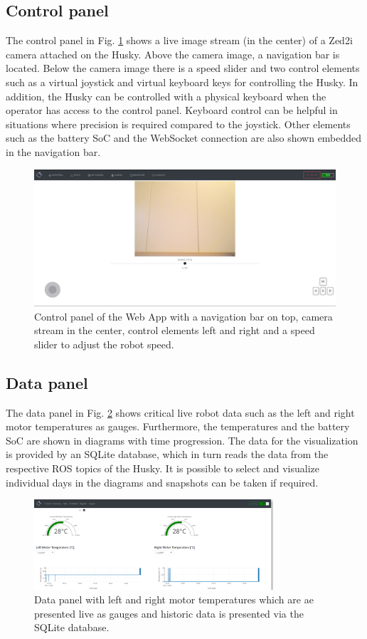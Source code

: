 \documentclass[letterpaper, 10 pt, conference]{ieeeconf}  %
\begin{document}
\subsection{Control panel}
The control panel in Fig. \ref{fig:controlpanel} shows a live image stream (in the center) of a Zed2i camera attached on the Husky. Above the camera image, a navigation bar is located. 
Below the camera image there is a speed slider and two control elements such as a virtual joystick and virtual keyboard keys for controlling the Husky. 
In addition, the Husky can be controlled with a physical keyboard when the operator has access to the control panel. Keyboard control can be helpful in situations where precision is required compared to the joystick.
Other elements such as the battery SoC and the WebSocket connection are also shown embedded in the navigation bar.
\begin{figure}[b]
    \centerline{\includegraphics[width=0.98\columnwidth]{images/control_panel.png}}
    \caption{Control panel of the Web App with a navigation bar on top, camera stream in the center, control elements left and right and a speed slider to adjust the robot speed.}
    \label{fig:controlpanel}
\end{figure}
\subsection{Data panel}
The data panel in Fig. \ref{fig:overviewplots} shows critical live robot data such as the left and right motor temperatures as gauges. 
Furthermore, the temperatures and the battery SoC are shown in diagrams with time progression. 
The data for the visualization is provided by an SQLite database, which in turn reads the data from the respective ROS topics of the Husky. 
It is possible to select and visualize individual days in the diagrams and snapshots can be taken if required.

\begin{figure}[htbp]
    \centerline{\includegraphics[width=8.9cm]{images/overviewplots.png}}
    \caption{Data panel with left and right motor temperatures which are ae presented live as gauges and historic data is presented via the SQLite database.}
    \label{fig:overviewplots}
\end{figure}
\end{document}
